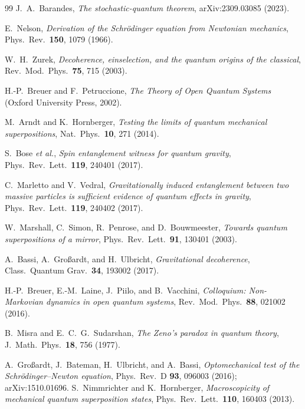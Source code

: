 \documentclass[aps,pra,preprint,amsmath,amssymb,nofootinbib,superscriptaddress]{revtex4-2}
\begin{document}
\begin{thebibliography}{99}
 J.~A.~Barandes,
\textit{The stochastic-quantum theorem}, arXiv:2309.03085 (2023).

 E.~Nelson,
\textit{Derivation of the Schr\"odinger equation from Newtonian mechanics},
Phys.\ Rev.\ \textbf{150}, 1079 (1966).

 W.~H.~Zurek,
\textit{Decoherence, einselection, and the quantum origins of the classical},
Rev.\ Mod.\ Phys.\ \textbf{75}, 715 (2003).

 H.-P.~Breuer and F.~Petruccione,
\textit{The Theory of Open Quantum Systems} (Oxford University Press, 2002).

 M.~Arndt and K.~Hornberger,
\textit{Testing the limits of quantum mechanical superpositions},
Nat.\ Phys.\ \textbf{10}, 271 (2014).

 S.~Bose \emph{et al.},
\textit{Spin entanglement witness for quantum gravity},
Phys.\ Rev.\ Lett.\ \textbf{119}, 240401 (2017).

 C.~Marletto and V.~Vedral,
\textit{Gravitationally induced entanglement between two massive particles is
sufficient evidence of quantum effects in gravity},
Phys.\ Rev.\ Lett.\ \textbf{119}, 240402 (2017).

 W.~Marshall, C.~Simon, R.~Penrose, and D.~Bouwmeester,
\textit{Towards quantum superpositions of a mirror},
Phys.\ Rev.\ Lett.\ \textbf{91}, 130401 (2003).

 A.~Bassi, A.~Gro\ss{}ardt, and H.~Ulbricht,
\textit{Gravitational decoherence},
Class.\ Quantum Grav.\ \textbf{34}, 193002 (2017).

 H.-P.~Breuer, E.-M.~Laine, J.~Piilo, and B.~Vacchini,
\textit{Colloquium: Non-Markovian dynamics in open quantum systems},
Rev.\ Mod.\ Phys.\ \textbf{88}, 021002 (2016).

 B.~Misra and E.~C.~G.~Sudarshan,
\textit{The Zeno's paradox in quantum theory},
J.\ Math.\ Phys.\ \textbf{18}, 756 (1977).

 A.~Gro\ss{}ardt, J.~Bateman, H.~Ulbricht, and A.~Bassi, \textit{Optomechanical test of the Schr\"odinger--Newton equation}, Phys.\ Rev.\ D \textbf{93}, 096003 (2016); arXiv:1510.01696.
 S.~Nimmrichter and K.~Hornberger,
\textit{Macroscopicity of mechanical quantum superposition states},
Phys.\ Rev.\ Lett.\ \textbf{110}, 160403 (2013).

\end{thebibliography}
\end{document}
